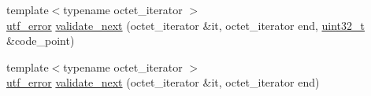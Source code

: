 \begin{DoxyCompactItemize}
\item 
{\footnotesize template$<$typename octet\+\_\+iterator $>$ }\\\hyperlink{namespaceutf8_1_1internal_a9e96c2bc98b37e336b787a281090392c}{utf\+\_\+error} \hyperlink{namespaceutf8_1_1internal_abe95547575fcc81911e381df03f8ebfe}{validate\+\_\+next} (octet\+\_\+iterator \&it, octet\+\_\+iterator end, \hyperlink{namespaceutf8_a846259d2f173d524282583fc9d825b00}{uint32\+\_\+t} \&code\+\_\+point)
\item 
{\footnotesize template$<$typename octet\+\_\+iterator $>$ }\\\hyperlink{namespaceutf8_1_1internal_a9e96c2bc98b37e336b787a281090392c}{utf\+\_\+error} \hyperlink{namespaceutf8_1_1internal_afd41668f94ce9f60f8e314d05804cecc}{validate\+\_\+next} (octet\+\_\+iterator \&it, octet\+\_\+iterator end)
\end{DoxyCompactItemize}

